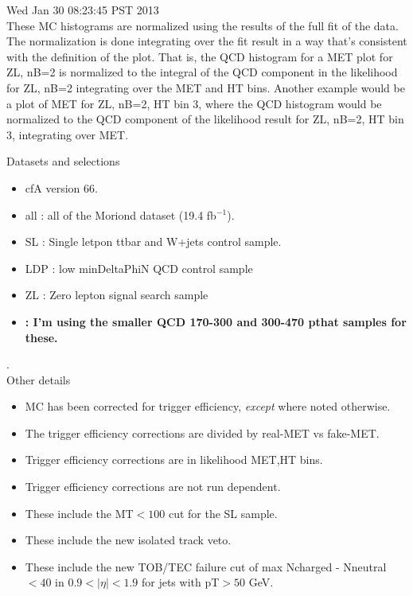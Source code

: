 \documentclass[11pt]{article}
\begin{document}
  Wed Jan 30 08:23:45 PST 2013 \\


  These MC histograms are normalized using the results of the full fit of the data.
  The normalization is done integrating over the fit result in a way that's consistent
  with the definition of the plot.
  That is, the QCD histogram for a MET plot for ZL, nB=2 is normalized to the
  integral of the QCD component in the likelihood for ZL, nB=2 integrating
  over the MET and HT bins.
  Another example would be a plot of MET for ZL, nB=2, HT bin 3, where the
  QCD histogram would be normalized to the QCD component of the likelihood
  result for ZL, nB=2, HT bin 3, integrating over MET.

  \vspace{1cm}

   Datasets and selections
   \begin{itemize}
     \item cfA version 66.
     \item all : all of the Moriond dataset (19.4 fb$^{-1}$).
     \item SL : Single letpon ttbar and W+jets control sample.
     \item LDP : low minDeltaPhiN QCD control sample
     \item ZL : Zero lepton signal search sample
     \item {\bf : I'm using the smaller QCD 170-300 and 300-470 pthat samples for these.}
   \end{itemize}

.\\

   Other details
   \begin{itemize}
     \item MC has been corrected for trigger efficiency, {\it except} where noted otherwise.
     \item  The trigger efficiency corrections are divided by real-MET vs fake-MET.
     \item Trigger efficiency corrections are in likelihood MET,HT bins.
     \item Trigger efficiency corrections are not run dependent.
     \item These include the MT$<100$ cut for the SL sample.
     \item These include the new isolated track veto.
     \item These include the new TOB/TEC failure cut of max Ncharged - Nneutral $<40$ in $0.9<|\eta|<1.9$ for
             jets with pT$>50$ GeV.
   \end{itemize}
\end{document}
